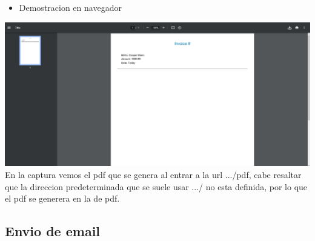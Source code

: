 \documentclass{article}
\begin{document}
        
        \begin{itemize}
            \item Demostracion en navegador\newline
            
        \end{itemize}
        \includegraphics[width=16cm]{img/PDF DEMOSTRACION IMG.png}
        \newline En la captura vemos el pdf que se genera al entrar a la url .../pdf, cabe resaltar que la direccion predeterminada que se suele usar .../ no esta definida, por lo que el pdf se generera en la de pdf.
        
        \subsection{Envio de email}
        
\end{document}
